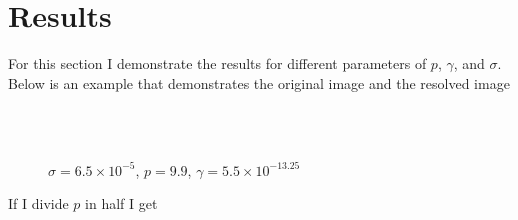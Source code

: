 \documentclass[margin=1in,12pt,3p]{elsarticle}
\begin{document}
\section{Results}
For this section I demonstrate the results for different parameters of $p$, $\gamma$, and $\sigma$. Below is an example that demonstrates the original image and the resolved image
\begin{figure}[h!]
  \centering
  \hfill
  \\
  \\
  \caption{$\sigma = 6.5\times 10^{-5}$, $p = 9.9$, $\gamma=5.5\times 10^{-13.25}$}
\end{figure}
If I divide $p$ in half I get
\clearpage
\end{document}
